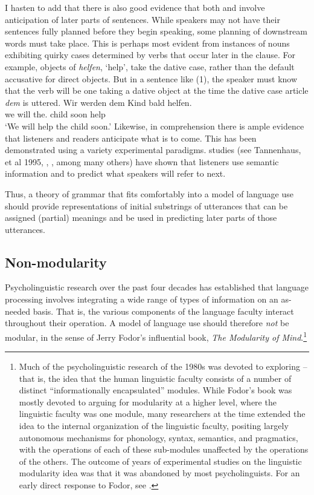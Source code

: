 \documentclass[a4paper]{article}
\begin{document}
I hasten to add that there is also good evidence that both  and  involve anticipation of later parts of sentences.  While speakers may not have their sentences fully planned before they begin speaking, some planning of downstream words must take place.  This is perhaps most evident from instances of nouns exhibiting quirky cases determined by verbs that occur later in the clause.  For example, objects of  \emph{helfen}, `help', take the dative case, rather than the default accusative for direct objects.  But in a sentence like (1), the speaker must know that the verb will be one taking a dative object at the time the dative case article \emph{dem} is uttered.
\ea
\gll Wir werden dem        Kind bald helfen.\\
     we will    the.\DAT{} child soon help\\\german
\glt `We will help the child soon.'
\z
Likewise, in comprehension there is ample evidence that listeners and readers anticipate what is to come.  This has been demonstrated using a variety experimental paradigms.   studies (see Tannenhaus, et al 1995, \citealt{AltmannKamide99}, \citealt{ArnoldEtal2007}, among many others) have shown that listeners use semantic information and  to predict what speakers will refer to next.

Thus, a theory of grammar that fits comfortably into a model of language use should provide representations of initial substrings of utterances that can be assigned (partial) meanings and be used in predicting later parts of those utterances.

\subsection{Non-modularity}

Psycholinguistic research over the past four decades has established that language processing involves integrating a wide range of types of information on an as-needed basis.  That is, the
various components of the language faculty interact throughout their operation.  A model of language use should therefore \emph{not} be modular, in the sense of Jerry Fodor's influential \citeyearpar{Fodor83a-u} book, \emph{The Modularity of Mind}.\footnote{Much of the psycholinguistic research of the 1980s was devoted to exploring  -- that is, the idea that the human linguistic faculty consists of a number of distinct ``informationally encapsulated'' modules.  While Fodor's book was mostly devoted to arguing for modularity at a higher level, where the linguistic faculty was one module, many researchers at the time extended the idea to the internal organization of the linguistic faculty, positing largely autonomous mechanisms for phonology, syntax, semantics, and pragmatics, with the operations of each of these sub-modules unaffected by the operations of the others. The outcome of years of experimental studies on the linguistic modularity idea was that it was abandoned by most psycholinguists. For an early direct response to Fodor, see \citet{MarslenTyler87}.}
\end{document}
